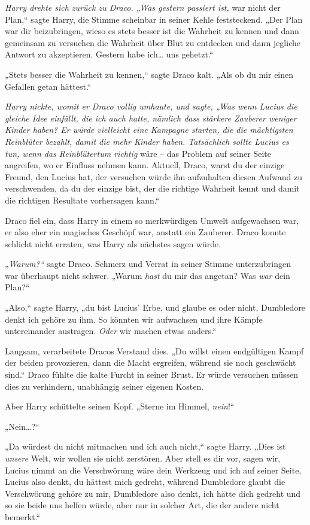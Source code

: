 {\emph{Harry drehte sich zurück zu Draco. „Was gestern passiert ist,} war nicht der Plan,“ sagte Harry, die Stimme scheinbar in seiner Kehle feststeckend. „Der Plan war dir beizubringen, wieso es stets besser ist die Wahrheit zu kennen und dann gemeinsam zu versuchen die Wahrheit über Blut zu entdecken und dann jegliche Antwort zu akzeptieren. Gestern habe ich… uns gehetzt.“

\emph{„}Stets besser die Wahrheit zu kennen,“ sagte Draco kalt. „Als ob du mir einen Gefallen getan hättest.“

\emph{Harry nickte, womit er Draco vollig umhaute, und sagte, „Was wenn Lucius die gleiche Idee einfällt, die ich auch hatte, nämlich dass stärkere Zauberer weniger Kinder haben? Er würde vielleicht eine Kampagne starten, die die mächtigsten Reinblüter bezahlt, damit die mehr Kinder haben. Tatsächlich sollte Lucius es tun, wenn das Reinblütertum richtig} wäre -- das Problem auf seiner Seite angreifen, wo er Einfluss nehmen kann. Aktuell, Draco, warst du der einzige Freund, den Lucius hat, der versuchen würde ihn aufzuhalten diesen Aufwand zu verschwenden, da du der einzige bist, der die richtige Wahrheit kennt und damit die richtigen Resultate vorhersagen kann.“

Draco fiel ein, dass Harry in einem so merkwürdigen Umwelt aufgewachsen war, er also eher ein magisches Geschöpf war, anstatt ein Zauberer. Draco konnte schlicht nicht erraten, was Harry als nächstes sagen würde.

„\emph{Warum?“} sagte Draco. Schmerz und Verrat in seiner Stimme unterzubringen war überhaupt nicht schwer. „Warum \emph{hast} du mir das angetan? Was \emph{war} dein Plan?“

„Also,“ sagte Harry, „du bist Lucius' Erbe, und glaube es oder nicht, Dumbledore denkt ich gehöre zu ihm. So könnten wir aufwachsen und ihre Kämpfe untereinander austragen. \emph{Oder} wir machen etwas anders.“

Langsam, verarbeitete Dracos Verstand dies. „Du willst einen endgültigen Kampf der beiden provozieren, dann die Macht ergreifen, während sie noch geschwächt sind.“ Draco fühlte die kalte Furcht in seiner Brust. Er würde versuchen müssen dies zu verhindern, unabhängig seiner eigenen Kosten.

Aber Harry schüttelte seinen Kopf. „Sterne im Himmel, \emph{nein}!“

„Nein…?“

„Da würdest du nicht mitmachen und ich auch nicht,“ sagte Harry. „Dies ist \emph{unsere} Welt, wir wollen sie nicht zerstören. Aber stell es dir vor, sagen wir, Lucius nimmt an die Verschwörung wäre dein Werkzeug und ich auf seiner Seite, Lucius also denkt, du hättest mich gedreht, während Dumbledore glaubt die Verschwörung gehöre zu mir, Dumbledore also denkt, ich hätte dich gedreht und so sie beide uns helfen würde, aber nur in solcher Art, die der andere nicht bemerkt.“

}
